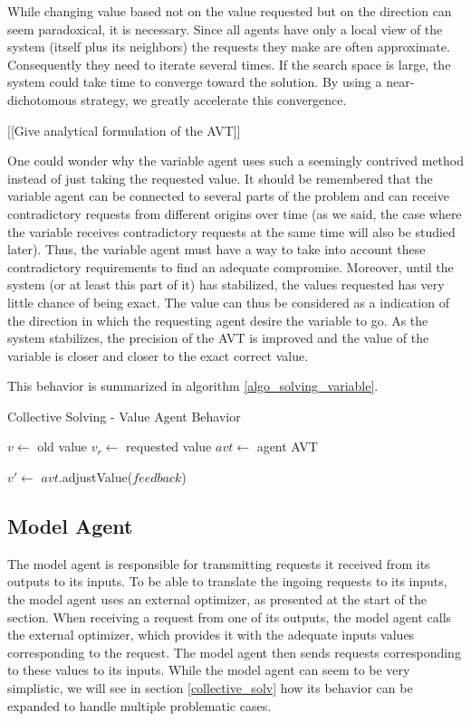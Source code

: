 While changing value based not on the value requested but on the direction can seem paradoxical, it is necessary. Since all agents have only a local view of the system (itself plus its neighbors) the requests they make are often approximate. Consequently they need to iterate several times. If the search space is large, the system could take time to converge toward the solution. By using a near-dichotomous strategy, we greatly accelerate this convergence.

[[Give analytical formulation of the AVT]]

One could wonder why the variable agent uses such a seemingly contrived method instead of just taking the requested value. It should be remembered that the variable agent can be connected to several parts of the problem and can receive contradictory requests from different origins over time (as we said, the case where the variable receives contradictory requests at the same time will also be studied later). Thus, the variable agent must have a way to take into account these contradictory requirements to find an adequate compromise. Moreover, until the system (or at least this part of it) has stabilized, the values requested has very little chance of being exact. The value can thus be considered as a  indication of the direction in which the requesting agent desire the variable to go. As the system stabilizes, the precision of the AVT is improved and the value of the variable is closer and closer to the exact correct value.

This behavior is summarized in algorithm \ref{algo_solving_variable}.

\begin{algorithm}
\caption{Collective Solving - Value Agent Behavior}
\label{algo_solving_variable}

	$v \leftarrow$ old value\;
	$v_r \leftarrow$ requested value\;
	$avt \leftarrow$ agent AVT \;
	
	$v' \leftarrow$ $avt$.adjustValue($feedback$)\;
	
\end{algorithm}

\subsection{Model Agent}\label{model_agent_solving}

The model agent is responsible for transmitting requests it received from its outputs to its inputs. To be able to translate the ingoing requests to its inputs, the model agent uses an external optimizer, as presented at the start of the section. When receiving a request from one of its outputs, the model agent calls the external optimizer, which provides it with the adequate inputs values corresponding to the request. The model agent then sends requests corresponding to these values to its inputs.
While the model agent can seem to be very simplistic, we will see in section \ref{collective_solv} how its 
behavior can be expanded to handle multiple problematic cases.

